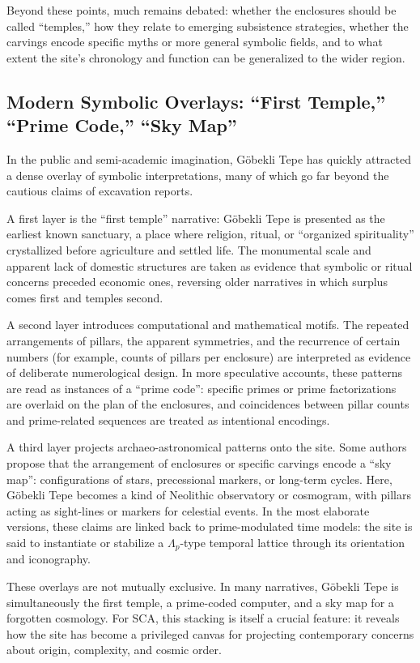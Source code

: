 \documentclass[12]{amsart}
\theoremstyle{plain}
\begin{document}
Beyond these points, much remains debated: whether the enclosures should be called ``temples,'' how they relate to emerging subsistence strategies, whether the carvings encode specific myths or more general symbolic fields, and to what extent the site's chronology and function can be generalized to the wider region.

\subsection{Modern Symbolic Overlays: ``First Temple,'' ``Prime Code,'' ``Sky Map''}

In the public and semi-academic imagination, Göbekli Tepe has quickly attracted a dense overlay of symbolic interpretations, many of which go far beyond the cautious claims of excavation reports.

A first layer is the ``first temple'' narrative: Göbekli Tepe is presented as the earliest known sanctuary, a place where religion, ritual, or ``organized spirituality'' crystallized before agriculture and settled life. The monumental scale and apparent lack of domestic structures are taken as evidence that symbolic or ritual concerns preceded economic ones, reversing older narratives in which surplus comes first and temples second.

A second layer introduces computational and mathematical motifs. The repeated arrangements of pillars, the apparent symmetries, and the recurrence of certain numbers (for example, counts of pillars per enclosure) are interpreted as evidence of deliberate numerological design. In more speculative accounts, these patterns are read as instances of a ``prime code'': specific primes or prime factorizations are overlaid on the plan of the enclosures, and coincidences between pillar counts and prime-related sequences are treated as intentional encodings.

A third layer projects archaeo-astronomical patterns onto the site. Some authors propose that the arrangement of enclosures or specific carvings encode a ``sky map'': configurations of stars, precessional markers, or long-term cycles. Here, Göbekli Tepe becomes a kind of Neolithic observatory or cosmogram, with pillars acting as sight-lines or markers for celestial events. In the most elaborate versions, these claims are linked back to prime-modulated time models: the site is said to instantiate or stabilize a $\Lambda_p$-type temporal lattice through its orientation and iconography.

These overlays are not mutually exclusive. In many narratives, Göbekli Tepe is simultaneously the first temple, a prime-coded computer, and a sky map for a forgotten cosmology. For SCA, this stacking is itself a crucial feature: it reveals how the site has become a privileged canvas for projecting contemporary concerns about origin, complexity, and cosmic order.
\end{document}
